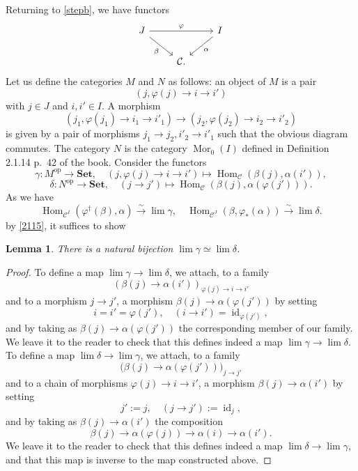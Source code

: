 \documentclass[12pt]{article}
\newtheorem{lem}[thm]{Lemma}
\theoremstyle{remark}
\theoremstyle{definition}
\newcommand{\C}{\mathcal C}
\newcommand{\Set}{\mathbf{Set}}
\newcommand{\xr}{\xrightarrow}
\DeclareMathOperator{\id}{id}
\DeclareMathOperator{\Hom}{Hom}%
\DeclareMathOperator{\Mor}{Mor}
\DeclareMathOperator{\op}{op}
\begin{document}
Returning to \eqref{stepb}, we have functors 
$$
\begin{tikzcd}
J\ar{rr}{\varphi}\ar{dr}[swap]{\beta}&&I\ar{dl}{\alpha}\\ 
&\C.
\end{tikzcd}
$$ 
Let us define the categories $M$ and $N$ as follows: an object of $M$ is a pair 
$$
(j,\varphi(j)\to i\to i')
$$ 
with $j\in J$ and $i,i'\in I$. A morphism 
$$
(j_1,\varphi(j_1)\to i_1\to i'_1)\to(j_2,\varphi(j_2)\to i_2\to i'_2)
$$ 
is given by a pair of morphisms $j_1\to j_2,i'_2\to i'_1$ such that the obvious diagram commutes. The category $N$ is the category $\Mor_0(I)$ defined in Definition 2.1.14 p.~42 of the book. Consider the functors 
$$
\gamma:M^{\op}\to\Set,\quad(j,\varphi(j)\to i\to i')\mapsto\Hom_\C(\beta(j),\alpha(i')), 
$$ 
$$
\delta:N^{\op}\to\Set,\quad(j\to j')\mapsto\Hom_\C(\beta(j),\alpha(\varphi(j'))). 
$$ 
As we have 
$$
\Hom_{\C^I}(\varphi^\dagger(\beta),\alpha)\xr\sim\lim\gamma,\quad
\Hom_{\C^J}(\beta,\varphi_*(\alpha))\xr\sim\lim\delta. 
$$ 
by \eqref{2115}, it suffices to show 
%
\begin{lem}
%
There is a natural bijection $\lim\gamma\simeq\lim\delta$. 
%
\end{lem} 
%
\begin{proof}
To define a map $\lim\gamma\to\lim\delta$, we attach, to a family 
$$
(\beta(j)\to\alpha(i'))_{\varphi(j)\to i\to i'}
$$ 
and to a morphism $j\to j'$, a morphism $\beta(j)\to\alpha(\varphi(j'))$ by setting 
$$
i=i'=\varphi(j'),\quad(i\to i')=\id_{\varphi(j')},
$$ 
and by taking as $\beta(j)\to\alpha(\varphi(j'))$ the corresponding member of our family. We leave it to the reader to check that this defines indeed a map $\lim\gamma\to\lim\delta$. To define a map $\lim\delta\to\lim\gamma$, we attach, to a family 
$$
\big(\beta(j)\to\alpha(\varphi(j'))\big)_{j\to j'}
$$ 
and to a chain of morphisms $\varphi(j)\to i\to i'$, a morphism $\beta(j)\to\alpha(i')$ by setting 
$$
j':=j,\quad(j\to j'):=\id_{j},
$$ 
and by taking as $\beta(j)\to\alpha(i')$ the composition 
$$
\beta(j)\to\alpha(\varphi(j))\to\alpha(i)\to\alpha(i'). 
$$ 
We leave it to the reader to check that this defines indeed a map $\lim\delta\to\lim\gamma$, and that this map is inverse to the map constructed above.
\end{proof}
%
\end{document}
